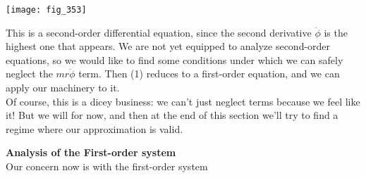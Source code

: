 \documentclass{article}
\newcommand\tab[1][1cm]{\hspace*{#1}}
\begin{document}
\texttt{[image: fig\_353]}

This is a second-order differential equation, since the second derivative $\ddot{\phi}$ is the highest one that appears. We are not yet equipped to analyze second-order equations, so we would like to find some conditions under which we can safely neglect the $mr\ddot{\phi}$ term. Then (1) reduces to a first-order equation, and we can apply our machinery to it. \\
\tab Of course, this is a dicey business: we can't just neglect terms because we feel like it! But we will for now, and then at the end of this section we'll try to find a regime where our approximation is valid.

\textbf {Analysis of the First-order system}
\\ Our concern now is with the first-order system
\end{document}
